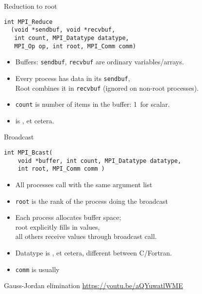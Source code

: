 \begin{numberedframe}{Reduction to root}
\lstset{language=C}
\begin{lstlisting}
int MPI_Reduce
  (void *sendbuf, void *recvbuf,
   int count, MPI_Datatype datatype, 
   MPI_Op op, int root, MPI_Comm comm)
\end{lstlisting}
\begin{itemize}
\item Buffers: \lstinline{sendbuf}, \lstinline{recvbuf} are ordinary variables/arrays.
\item Every process has data in its \lstinline{sendbuf},\\
  Root combines it in \lstinline{recvbuf} (ignored on non-root processes).
\item \lstinline{count} is number of items in the buffer: 1~for scalar.
\item {} is ,  et cetera.
\end{itemize}
\end{numberedframe}

\begin{numberedframe}{Broadcast}
\begin{lstlisting}
int MPI_Bcast(
    void *buffer, int count, MPI_Datatype datatype, 
    int root, MPI_Comm comm )
\end{lstlisting}
\begin{itemize}
\item All processes call with the same argument list
\item \lstinline{root} is the rank of the process doing the broadcast
\item Each process allocates buffer space;\\
  root explicitly fills in values,\\
  all others receive values through broadcast call.
\item Datatype is ,  et cetera, different
  between C/Fortran.
\item \lstinline{comm} is usually 
\end{itemize}
\end{numberedframe}

\begin{numberedframe}{Gauss-Jordan elimination}
  \url{https://youtu.be/aQYuwatlWME}
\end{numberedframe}

\begin{exerciseframe}[jordan]
  \small
  
\end{exerciseframe}

